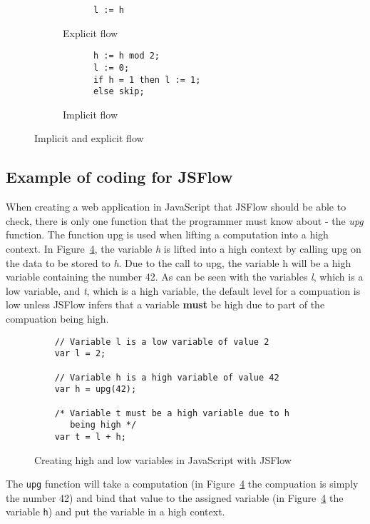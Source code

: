 \begin{figure}[h]
  \captionsetup[subfigure]{singlelinecheck=off,justification=raggedright}
  \begin{subfigure}[b]{0.5\textwidth}
    \begin{verbatim}
      l := h
    \end{verbatim}
    \caption{Explicit flow}
    \label{fig:expflow}
  \end{subfigure}
  \begin{subfigure}[b]{0.5\textwidth}
    \begin{verbatim}
      h := h mod 2;
      l := 0;
      if h = 1 then l := 1;
      else skip;
    \end{verbatim}
    \caption{Implicit flow}
    \label{fig:impflow}
  \end{subfigure}
  \caption{Implicit and explicit flow}
\end{figure}

\subsection{Example of coding for JSFlow}
When creating a web application in JavaScript that JSFlow should be able to check, there is only one function that the programmer must know about - the \emph{upg} function. The function upg is used when lifting a computation into a high context. In Figure~\ref{fig:upg}, the variable \emph{h} is lifted into a high context by calling upg on the data to be stored to \emph{h}. Due to the call to upg, the variable h will be a high variable containing the number 42. As can be seen with the variables \emph{l}, which is a low variable, and \emph{t}, which is a high variable, the default level for a compuation is low unless JSFlow infers that a variable \textbf{must} be high due to part of the compuation being high.

\begin{figure}[h]
  \begin{verbatim}
    // Variable l is a low variable of value 2
    var l = 2;

    // Variable h is a high variable of value 42
    var h = upg(42);

    /* Variable t must be a high variable due to h
       being high */
    var t = l + h;
  \end{verbatim}
  \caption{Creating high and low variables in JavaScript with JSFlow}
  \label{fig:upg}
\end{figure}
The {\tt upg} function will take a computation (in Figure~\ref{fig:upg} the compuation is simply the number 42) and bind that value to the assigned variable (in Figure~\ref{fig:upg} the variable {\tt h}) and put the variable in a high context.

